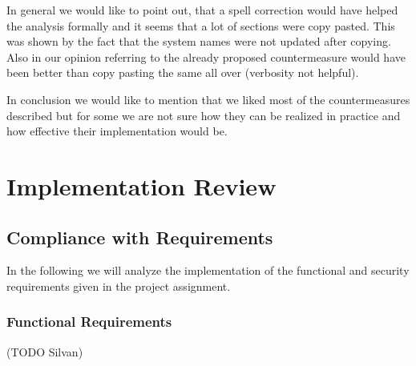 \documentclass[english]{article}
\begin{document}
In general we would like to point out, that a spell correction would have helped the analysis formally and it seems that a lot of sections were copy pasted. This was shown by the fact that the system names were not updated after copying. Also in our opinion referring to the already proposed countermeasure would have been better than copy pasting the same all over (verbosity not helpful).  

In conclusion we would like to mention that we liked most of the countermeasures described but for some we are not sure how they can be realized in practice and how effective their implementation would be.
	

\section{Implementation Review}
 
\subsection{Compliance with Requirements} 

In the following we will analyze the implementation of the functional and security requirements given in the project assignment.

\subsubsection{Functional Requirements} (TODO Silvan)
\end{document}
